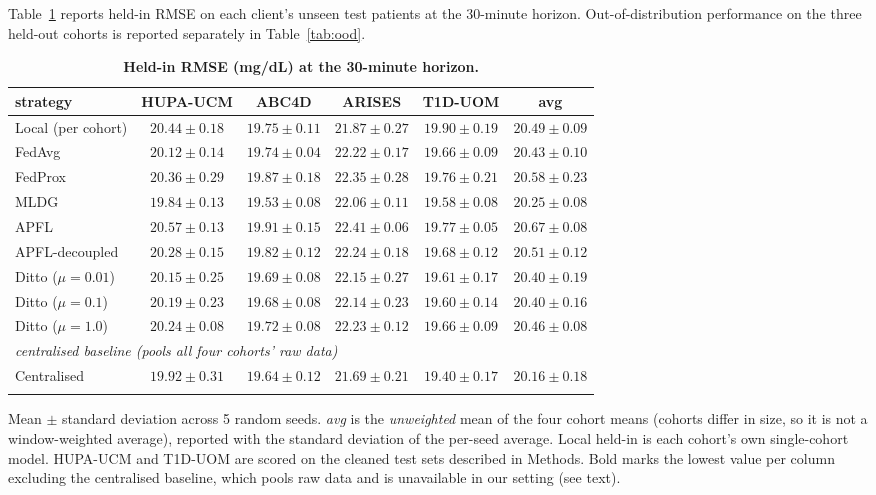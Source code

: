 \documentclass[10pt,letterpaper]{article}
\newlength\savedwidth
\newcommand\thickhline{\noalign{\global\savedwidth\arrayrulewidth\global\arrayrulewidth 2pt}%
\hline
\noalign{\global\arrayrulewidth\savedwidth}}
\begin{document}
Table~\ref{tab:main} reports held-in RMSE on each client's unseen test patients at
the 30-minute horizon. Out-of-distribution performance on
the three held-out cohorts is reported separately in Table~\ref{tab:ood}.

\begin{table}[!ht]
\centering
\captionsetup{justification=centering,singlelinecheck=on}
\caption{\bf Held-in RMSE (mg/dL) at the 30-minute horizon.}
\label{tab:main}
\begin{tabular}{lccccc}
\thickhline
strategy & HUPA-UCM & ABC4D & ARISES & T1D-UOM & avg \\
\hline
Local (per cohort) & $20.44 \pm 0.18$ & $19.75 \pm 0.11$ & $\mathbf{21.87 \pm 0.27}$ & $19.90 \pm 0.19$ & $20.49 \pm 0.09$ \\
\hline
FedAvg  & $20.12 \pm 0.14$ & $19.74 \pm 0.04$ & $22.22 \pm 0.17$ & $19.66 \pm 0.09$ & $20.43 \pm 0.10$ \\
FedProx & $20.36 \pm 0.29$ & $19.87 \pm 0.18$ & $22.35 \pm 0.28$ & $19.76 \pm 0.21$ & $20.58 \pm 0.23$ \\
MLDG    & $\mathbf{19.84 \pm 0.13}$ & $\mathbf{19.53 \pm 0.08}$ & $22.06 \pm 0.11$ & $\mathbf{19.58 \pm 0.08}$ & $\mathbf{20.25 \pm 0.08}$ \\
\hline
APFL           & $20.57 \pm 0.13$ & $19.91 \pm 0.15$ & $22.41 \pm 0.06$ & $19.77 \pm 0.05$ & $20.67 \pm 0.08$ \\
APFL-decoupled & $20.28 \pm 0.15$ & $19.82 \pm 0.12$ & $22.24 \pm 0.18$ & $19.68 \pm 0.12$ & $20.51 \pm 0.12$ \\
Ditto ($\mu{=}0.01$) & $20.15 \pm 0.25$ & $19.69 \pm 0.08$ & $22.15 \pm 0.27$ & $19.61 \pm 0.17$ & $20.40 \pm 0.19$ \\
Ditto ($\mu{=}0.1$)  & $20.19 \pm 0.23$ & $19.68 \pm 0.08$ & $22.14 \pm 0.23$ & $19.60 \pm 0.14$ & $20.40 \pm 0.16$ \\
Ditto ($\mu{=}1.0$)  & $20.24 \pm 0.08$ & $19.72 \pm 0.08$ & $22.23 \pm 0.12$ & $19.66 \pm 0.09$ & $20.46 \pm 0.08$ \\
\hline
\multicolumn{6}{l}{\emph{centralised baseline (pools all four cohorts' raw data)}} \\
Centralised & $19.92 \pm 0.31$ & $19.64 \pm 0.12$ & $21.69 \pm 0.21$ & $19.40 \pm 0.17$ & $20.16 \pm 0.18$ \\
\thickhline
\end{tabular}
\begin{center}
{\small Mean $\pm$ standard deviation across 5 random seeds.
\emph{avg} is the \emph{unweighted} mean of the four cohort means (cohorts differ
in size, so it is not a window-weighted average), reported with the standard
deviation of the per-seed average. Local held-in is each cohort's own
single-cohort model. HUPA-UCM and T1D-UOM are scored on the cleaned test sets
described in Methods. Bold marks the lowest value per column excluding the
centralised baseline, which pools raw data and is unavailable in our setting
(see text).}
\end{center}
\end{table}
\end{document}
